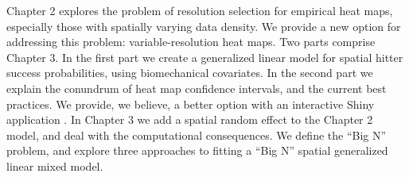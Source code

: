 
Chapter 2 explores the problem of resolution selection for empirical heat maps, especially those with spatially varying data density. We provide a new option for addressing this problem: variable-resolution heat maps. Two parts comprise Chapter 3. In the first part we create a generalized linear model for spatial hitter success probabilities, using biomechanical covariates. In the second part we explain the conundrum of heat map confidence intervals, and the current best practices. We provide, we believe, a better option with an interactive Shiny application \citep{Shiny}. In Chapter 3 we add a spatial random effect to the Chapter 2 model, and deal with the computational consequences. We define the ``Big N'' problem, and explore three approaches to fitting a ``Big N'' spatial generalized linear mixed model. 
